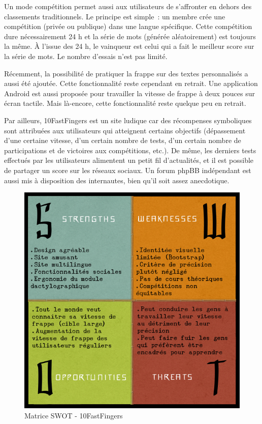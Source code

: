 \documentclass[a4paper,12pt]{article}
\begin{document}
Un mode compétition permet aussi aux utilisateurs de s'affronter en dehors des classements traditionnels. Le principe est simple~: un membre crée une compétition (privée ou publique) dans une langue spécifique. Cette compétition dure nécessairement 24 h et la série de mots (générée aléatoirement) est toujours la même. À l'issue des 24 h, le vainqueur est celui qui a fait le meilleur score sur la série de mots. Le nombre d'essais n'est pas limité.

Récemment, la possibilité de pratiquer la frappe sur des textes personnalisés a aussi été ajoutée. Cette fonctionnalité reste cependant en retrait. Une application Android est aussi proposée pour travailler la vitesse de frappe à deux pouces sur écran tactile. Mais là-encore, cette fonctionnalité reste quelque peu en retrait.

Par ailleurs, 10FastFingers est un site ludique car des récompenses symboliques sont attribuées aux utilisateurs qui atteignent certains objectifs (dépassement d'une certaine vitesse, d'un certain nombre de tests, d'un certain nombre de participations et de victoires aux compétitions, etc.). De même, les derniers tests effectués par les utilisateurs alimentent un petit fil d'actualités, et il est possible de partager un score sur les réseaux sociaux. Un forum phpBB indépendant est aussi mis à disposition des internautes, bien qu'il soit assez anecdotique.

\begin{figure}
\begin{center}
\includegraphics[scale=0.5]{swot-10ff.png}
\end{center}
\caption{Matrice SWOT - 10FastFingers}
\end{figure}
\end{document}
